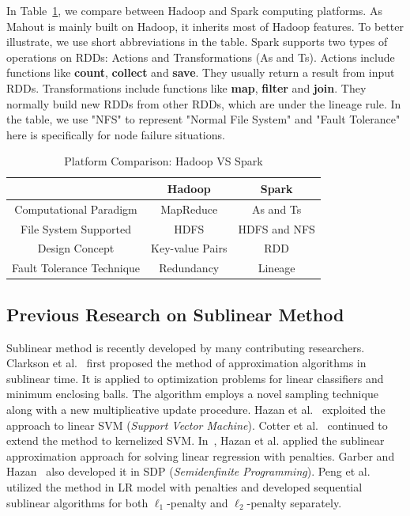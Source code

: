 \documentclass[10pt, conference, compsocconf]{IEEEtran}
\begin{document}
In Table~\ref{tab:systemcmp}, we compare between Hadoop and Spark computing platforms.
As Mahout is mainly built on Hadoop, it inherits most of Hadoop features.
To better illustrate, we use short abbreviations in the table.
Spark supports two types of operations on RDDs: Actions and Transformations (As and Ts).
Actions include functions like \textbf{count}, \textbf{collect} and \textbf{save}. They usually return a result from input RDDs.
Transformations include functions like \textbf{map}, \textbf{filter} and \textbf{join}. They normally build new RDDs from other RDDs, which are under the lineage rule.
In the table, we use "NFS" to represent "Normal File System" and "Fault Tolerance" here is specifically for node failure situations.
\begin{table}[h]
\centering
\caption{Platform Comparison: Hadoop VS Spark}\label{tab:systemcmp}
\begin{tabular}{|c|c|c|}
\hline
           & Hadoop & Spark \\
\hline
Computational Paradigm  & MapReduce & As and Ts \\
\hline
File System Supported & HDFS & HDFS and NFS \\
\hline
Design Concept  & Key-value Pairs & RDD \\
\hline
Fault Tolerance Technique & Redundancy & Lineage \\
\hline
\end{tabular}
\end{table}

\subsection{Previous Research on Sublinear Method}
Sublinear method is recently developed by many contributing researchers.
Clarkson et al.~\cite{clarkson2010sublinear} first proposed the method of approximation algorithms in sublinear time.
It is applied to optimization problems for linear classifiers and minimum enclosing balls.
The algorithm employs a novel sampling technique along with a new multiplicative update procedure.
Hazan et al.~\cite{hazanbeating} exploited the approach to linear SVM (\textit{Support Vector Machine}).
Cotter et al.~\cite{cotter2012kernelized} continued to extend the method to kernelized SVM.
In~\cite{hazan2011optimal}, Hazan et al. applied the sublinear approximation approach for solving linear regression with penalties.
Garber and Hazan~\cite{garberapproximating} also developed it in SDP (\textit{Semidenfinite Programming}).
Peng et al.~\cite{peng2012sublinear} utilized the method in LR model with penalties and developed sequential sublinear algorithms for both $\ell_1$-penalty and $\ell_2$-penalty separately.
\end{document}
